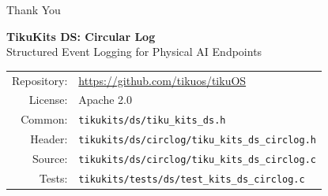 \documentclass[aspectratio=169, 10pt]{beamer}
\begin{document}
\begin{frame}{Thank You}
\begin{center}
\Large\textbf{TikuKits DS: Circular Log}\\[0.5em]
\normalsize Structured Event Logging for Physical AI Endpoints\\[1.5em]

\begin{tabular}{rl}
  Repository: & \url{https://github.com/tikuos/tikuOS} \\
  License:    & Apache 2.0 \\
  Common:     & \texttt{tikukits/ds/tiku\_kits\_ds.h} \\
  Header:     & \texttt{tikukits/ds/circlog/tiku\_kits\_ds\_circlog.h} \\
  Source:     & \texttt{tikukits/ds/circlog/tiku\_kits\_ds\_circlog.c} \\
  Tests:      & \texttt{tikukits/tests/ds/test\_kits\_ds\_circlog.c} \\
\end{tabular}
\end{center}
\end{frame}
\end{document}
